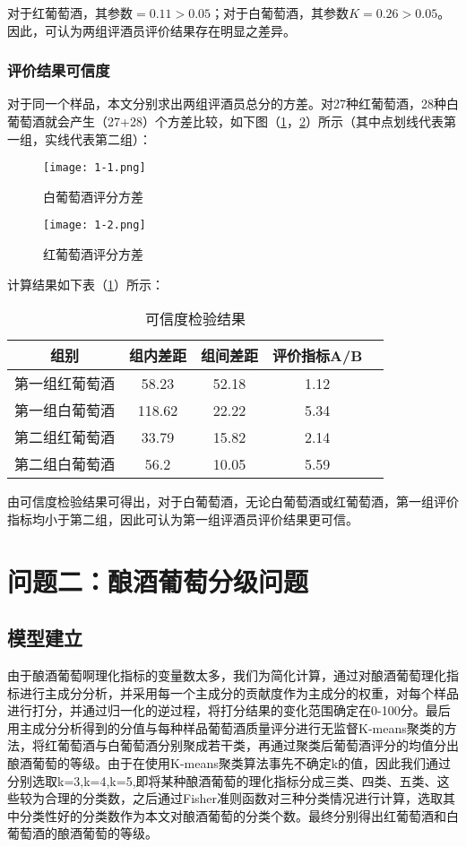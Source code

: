 \documentclass[withoutpreface,bwprint]{cumcmthesis} %
\begin{document}
对于红葡萄酒，其参数$=0.11>0.05$；对于白葡萄酒，其参数$K=0.26>0.05$。因此，可认为两组评酒员评价结果存在明显之差异。
\subsubsection{评价结果可信度}

对于同一个样品，本文分别求出两组评酒员总分的方差。对27种红葡萄酒，28种白葡萄酒就会产生（27+28）个方差比较，如下图（\ref{白葡萄酒评分方差}，\ref{红葡萄酒评分方差}）所示（其中点划线代表第一组，实线代表第二组）：
\begin{figure}[!h]
\centering
\texttt{[image: 1-1.png]}
\caption{白葡萄酒评分方差}
\label{白葡萄酒评分方差}
\end{figure}
\begin{figure}[!h]
\centering
\texttt{[image: 1-2.png]}
\caption{红葡萄酒评分方差}
\label{红葡萄酒评分方差}
\end{figure}

计算结果如下表（\ref{可信度检验结果}）所示：

\begin{table}[!htbp]
\centering
\caption{可信度检验结果}
\label{可信度检验结果}
\begin{tabular}{ccccc}
\toprule
组别 & 组内差距 & 组间差距 & 评价指标A/B\\
\midrule
第一组红葡萄酒 & 58.23 & 52.18  & 1.12\\

第一组白葡萄酒 & 118.62 & 22.22  & 5.34\\
第二组红葡萄酒 & 33.79 & 15.82 & 2.14\\
第二组白葡萄酒 & 56.2 & 10.05 &5.59\\
\bottomrule 
\end{tabular}
\end{table}


由可信度检验结果可得出，对于白葡萄酒，无论白葡萄酒或红葡萄酒，第一组评价指标均小于第二组，因此可认为第一组评酒员评价结果更可信。
\newpage
\section{问题二：酿酒葡萄分级问题}
\subsection{模型建立}

\par 由于酿酒葡萄啊理化指标的变量数太多，我们为简化计算，通过对酿酒葡萄理化指标进行主成分分析，并采用每一个主成分的贡献度作为主成分的权重，对每个样品进行打分，并通过归一化的逆过程，将打分结果的变化范围确定在0-100分。最后用主成分分析得到的分值与每种样品葡萄酒质量评分进行无监督K-means聚类的方法，将红葡萄酒与白葡萄酒分别聚成若干类，再通过聚类后葡萄酒评分的均值分出酿酒葡萄的等级。由于在使用K-means聚类算法事先不确定k的值，因此我们通过分别选取k=3,k=4,k=5,即将某种酿酒葡萄的理化指标分成三类、四类、五类、这些较为合理的分类数，之后通过Fisher准则函数对三种分类情况进行计算，选取其中分类性好的分类数作为本文对酿酒葡萄的分类个数。最终分别得出红葡萄酒和白葡萄酒的酿酒葡萄的等级。
\end{document}
